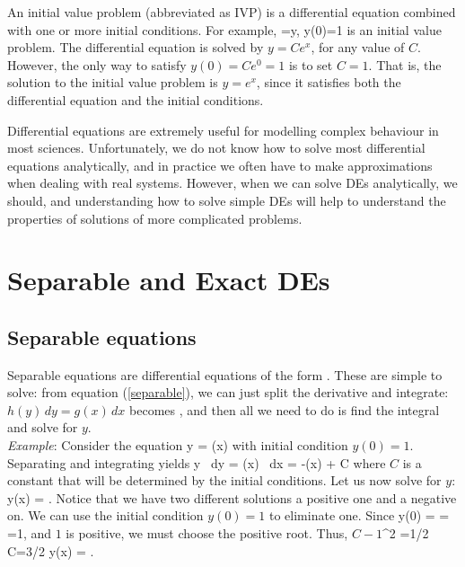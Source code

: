 \documentclass[12pt]{book}
\begin{document}
An initial value problem (abbreviated as IVP) is a differential equation
combined with one or more initial conditions. For example,
\bee
{}=y, \qquad y(0)=1
\eee
is an initial value problem.
The differential equation is solved by $y=Ce^x$, for any value of $C$. However,
the only way to satisfy $y(0)=Ce^0=1$ is to set $C=1$. That is, the solution
to the initial value problem is $y=e^x$, since it satisfies both the
differential equation and the initial conditions.

Differential equations are extremely useful for modelling complex behaviour in
most sciences. Unfortunately, we do not know how to solve most
differential equations analytically, and in practice we often have to
make approximations when dealing with real systems. However, when we can solve
DEs analytically, we should, and understanding how to solve simple DEs will
help to understand the properties of solutions of more complicated problems.



\chapter{Separable and Exact DEs}


\section{Separable equations}

Separable equations are differential equations of the form
\be \label{separable}
.
\ee
These are simple to solve: from equation (\ref{separable}), we can just split
the derivative and integrate: $ h(y)\, dy = g(x) \, dx$ becomes
\bee
{},
\eee
and then all we need to do is find the integral and solve for $y$.\\

\noindent\emph{Example}: Consider the equation
\be \label{separableexample}
  y  = \sin(x)
\ee
with initial condition $ y(0) = 1$. Separating and integrating yields
\bee
  \int y \, dy = \int \sin(x) \, dx
  \qquad \implies \qquad
   = -\cos(x) + C
\eee
where $C$ is a constant that will be determined by the initial conditions.
Let us now solve for $y$:
\bee
  y(x) = \pm {}.
\eee
Notice that we have two different solutions a positive one and a negative on.
 We can use the initial condition $y(0)=1$ to eliminate one. Since
\bee
  y(0) = \pm  {} = \pm {} =1,
\eee
and $1$ is positive, we must choose the positive root.
Thus,
\bee
\(C-1\)^2 =1/2
\quad \implies \quad
C=3/2
\quad \implies \quad
y(x) = .
\eee
\end{document}
